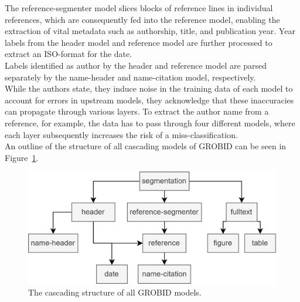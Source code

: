 The reference-segmenter model slices blocks of reference lines in individual references, which are consequently fed into the reference model, enabling the extraction of vital metadata such as authorship, title, and publication year. Year labels from the header model and reference model are further processed to extract an ISO-format for the date.\\
Labels identified as author by the header and reference model are parsed separately by the name-header and name-citation model, respectively.\\
While the authors state, they induce noise in the training data of each model to account for errors in upstream models, they acknowledge that these inaccuracies can propagate through various layers. To extract the author name from a reference, for example, the data has to pass through four different models, where each layer subsequently increases the risk of a miss-classification.\\
An outline of the structure of all cascading models of GROBID can be seen in Figure~\ref{fig:grobid}.\par

\begin{figure}[!th]
	\centering
	\includegraphics[width=0.7\linewidth]{images/grobid.png}
	\caption{The cascading structure of all GROBID models.}
	\label{fig:grobid}
\end{figure}

